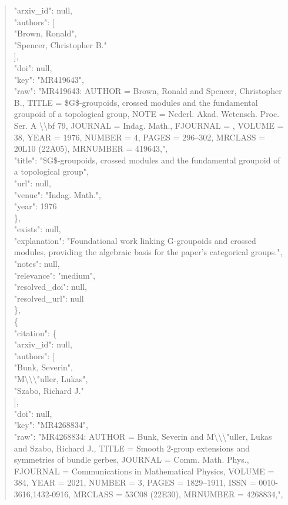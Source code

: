 \documentclass[11pt]{article}
\begin{document}
\begin{quote}
        "arxiv\_id": null,\\
        "authors": [\\
          "Brown, Ronald",\\
          "Spencer, Christopher B."\\
        ],\\
        "doi": null,\\
        "key": "MR419643",\\
        "raw": "MR419643: AUTHOR = Brown, Ronald and Spencer, Christopher B., TITLE = \$G\$-groupoids, crossed modules and the fundamental groupoid of a topological group, NOTE = Nederl. Akad. Wetensch. Proc. Ser. A \textbackslash{}\textbackslash{}bf 79, JOURNAL = Indag. Math., FJOURNAL = , VOLUME = 38, YEAR = 1976, NUMBER = 4, PAGES = 296--302, MRCLASS = 20L10 (22A05), MRNUMBER = 419643,",\\
        "title": "\$G\$-groupoids, crossed modules and the fundamental groupoid of a topological group",\\
        "url": null,\\
        "venue": "Indag. Math.",\\
        "year": 1976\\
      \},\\
      "exists": null,\\
      "explanation": "Foundational work linking G-groupoids and crossed modules, providing the algebraic basis for the paper's categorical groups.",\\
      "notes": null,\\
      "relevance": "medium",\\
      "resolved\_doi": null,\\
      "resolved\_url": null\\
    \},\\
    \{\\
      "citation": \{\\
        "arxiv\_id": null,\\
        "authors": [\\
          "Bunk, Severin",\\
          "M\textbackslash{}\textbackslash{}\textbackslash{}"uller, Lukas",\\
          "Szabo, Richard J."\\
        ],\\
        "doi": null,\\
        "key": "MR4268834",\\
        "raw": "MR4268834: AUTHOR = Bunk, Severin and M\textbackslash{}\textbackslash{}\textbackslash{}"uller, Lukas and Szabo, Richard J., TITLE = Smooth 2-group extensions and symmetries of bundle gerbes, JOURNAL = Comm. Math. Phys., FJOURNAL = Communications in Mathematical Physics, VOLUME = 384, YEAR = 2021, NUMBER = 3, PAGES = 1829--1911, ISSN = 0010-3616,1432-0916, MRCLASS = 53C08 (22E30), MRNUMBER = 4268834,",\\

\end{quote}
\end{document}
